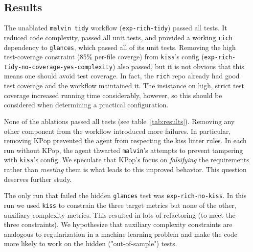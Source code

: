 \documentclass[11pt]{article}
\begin{document}
\subsection{Results}
\label{sec:results}


The unablated \texttt{malvin tidy} workflow (\texttt{exp-rich-tidy}) passed all tests. It reduced code complexity, passed all unit tests,
and provided a working \texttt{rich} dependency to \texttt{glances}, which passed all of its unit tests. Removing
the high test-coverage constraint (85\% per-file coverge) from \texttt{kiss}'s config (\texttt{exp-rich-tidy-no-coverage-yes-complexity})
also passed, but it is not obvious that this means one should avoid test coverage. In fact, the \texttt{rich} repo
already had good test coverage and the workflow maintained it. The insistance on high, strict test coverage
increased running time considerably, however, so this should be considered when determining a practical
configuration.

None of the ablations passed all tests (see table~\ref{tab:results}). Removing any other component from the workflow
introduced more failures. In particular, removing KPop prevented the agent from respecting the kiss linter 
rules. In each run without KPop, the agent thwarted \texttt{malvin}'s attempts to prevent tampering with
\texttt{kiss}'s config. We speculate that KPop's focus on \textit{falsifying} the requirements rather than 
\textit{meeting} them is what leads to this improved behavior. This question deserves further study.
 
The only run that failed the hidden \texttt{glances} test was \texttt{exp-rich-no-kiss}. In this run we
used \texttt{kiss} to constrain the three target metrics but none of the other, auxiliary complexity metrics. This resulted
in lots of refactoring (to meet the three constraints). We hypothesize that auxiliary complexity constraints
are analogous to regularization in a machine learning problem and make the code more likely to work on
the hidden ("out-of-sample") tests.
\end{document}
